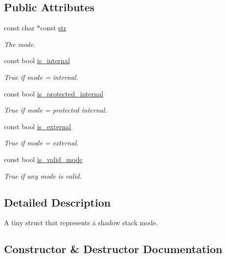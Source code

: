 \subsection*{Public Attributes}
\begin{DoxyCompactItemize}
\item 
const char $\ast$const \hyperlink{struct_s_s_mode_a82376c7c47401dc851ea16b1b35cd4b7}{str}
\begin{DoxyCompactList}\small\item\em The mode. \end{DoxyCompactList}\item 
const bool \hyperlink{struct_s_s_mode_a41f40fbedf3fd89f1422b27cb9a63a42}{is\+\_\+internal}
\begin{DoxyCompactList}\small\item\em True if mode = internal. \end{DoxyCompactList}\item 
const bool \hyperlink{struct_s_s_mode_a5c433033fb441d73f71a4bb3779774e2}{is\+\_\+protected\+\_\+internal}
\begin{DoxyCompactList}\small\item\em True if mode = protected internal. \end{DoxyCompactList}\item 
const bool \hyperlink{struct_s_s_mode_ad2f379904d72f81d5b8cbfddc46879a0}{is\+\_\+external}
\begin{DoxyCompactList}\small\item\em True if mode = external. \end{DoxyCompactList}\item 
const bool \hyperlink{struct_s_s_mode_aa6039b890f5475f03fc14efb2bc143c9}{is\+\_\+valid\+\_\+mode}
\begin{DoxyCompactList}\small\item\em True if any mode is valid. \end{DoxyCompactList}\end{DoxyCompactItemize}


\subsection{Detailed Description}
A tiny struct that represents a shadow stack mode. 

\subsection{Constructor \& Destructor Documentation}

